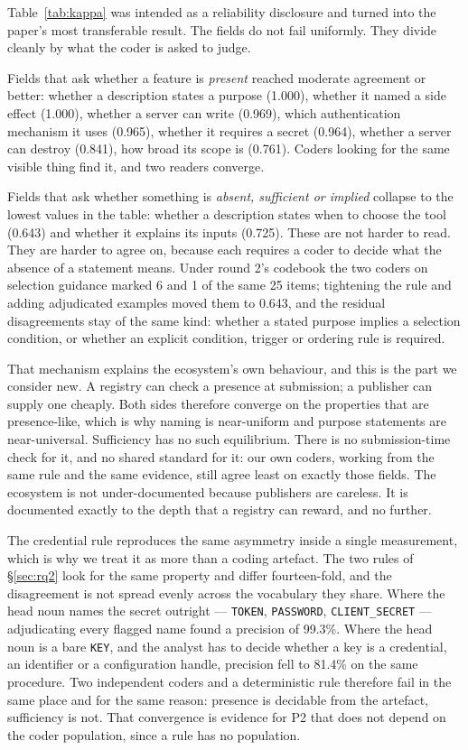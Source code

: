 \documentclass[a4paper,fleqn]{cas-dc}
\begin{document}
Table~\ref{tab:kappa} was intended as a reliability disclosure and turned into
the paper's most transferable result. The fields do not fail uniformly. They
divide cleanly by what the coder is asked to judge.

Fields that ask whether a feature is \emph{present} reached moderate agreement
or better: whether a description states a purpose (1.000), whether it named a
side effect (1.000), whether a server can write (0.969), which authentication
mechanism it uses (0.965), whether it requires a secret (0.964), whether a
server can destroy (0.841), how broad its scope is (0.761). Coders looking for
the same visible thing find it, and two readers converge.

Fields that ask whether something is \emph{absent, sufficient or implied}
collapse to the lowest values in the table: whether a description states when to
choose the tool (0.643) and whether it explains its inputs (0.725). These are
not harder to read. They are harder to
agree on, because each requires a coder to decide what the absence of a
statement means. Under round 2's codebook the two coders on selection guidance
marked 6 and 1 of the same 25 items; tightening the rule and adding adjudicated
examples moved them to 0.643, and the residual disagreements stay of the same
kind: whether a stated purpose implies a selection condition, or whether an
explicit condition, trigger or ordering rule is required.

That mechanism explains the ecosystem's own behaviour, and this is the part we
consider new. A registry can check a presence at submission; a publisher can
supply one cheaply. Both sides therefore converge on the properties that are
presence-like, which is why naming is near-uniform and purpose statements are
near-universal. Sufficiency has no such equilibrium. There is no submission-time
check for it, and no shared standard for it: our own coders, working from the
same rule and the same evidence, still agree least on exactly those fields. The
ecosystem is not under-documented because publishers are careless. It is
documented exactly to the depth that a registry can reward, and no further.

The credential rule reproduces the same asymmetry inside a single measurement,
which is why we treat it as more than a coding artefact. The two rules of
\S\ref{sec:rq2} look for the same property and differ fourteen-fold, and the
disagreement is not spread evenly across the vocabulary they share. Where the
head noun names the secret outright --- \texttt{TOKEN}, \texttt{PASSWORD},
\texttt{CLIENT\_SECRET} --- adjudicating every flagged name found a precision of
99.3\%. Where the head noun is a bare \texttt{KEY}, and the analyst has to
decide whether a key is a credential, an identifier or a configuration handle,
precision fell to 81.4\% on the same procedure. Two independent coders and a
deterministic rule therefore fail in the same place and for the same reason:
presence is decidable from the artefact, sufficiency is not. That convergence
is evidence for P2 that does not depend on the coder population, since a rule
has no population.
\end{document}
